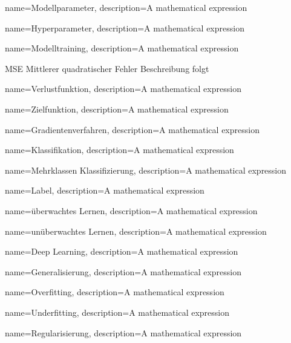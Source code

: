 {
        name=Modellparameter,
        description={A mathematical expression}
}

{
        name=Hyperparameter,
        description={A mathematical expression}
}

{
        name=Modelltraining,
        description={A mathematical expression}
}

\newglossaryentrywithacronym
{MSE}
{Mittlerer quadratischer Fehler}
{Beschreibung folgt}

{
        name=Verlustfunktion,
        description={A mathematical expression}
}

{
        name=Zielfunktion,
        description={A mathematical expression}
}

{
        name=Gradientenverfahren,
        description={A mathematical expression}
}

{
        name=Klassifikation,
        description={A mathematical expression}
}

{
        name=Mehrklassen Klassifizierung,
        description={A mathematical expression}
}

{
        name=Label,
        description={A mathematical expression}
}

{
        name=überwachtes Lernen,
        description={A mathematical expression}
}

{
        name=unüberwachtes Lernen,
        description={A mathematical expression}
}

{
        name=Deep Learning,
        description={A mathematical expression}
}

{
        name=Generalisierung,
        description={A mathematical expression}
}

{
        name=Overfitting,
        description={A mathematical expression}
}

{
        name=Underfitting,
        description={A mathematical expression}
}

{
        name=Regularisierung,
        description={A mathematical expression}
}

